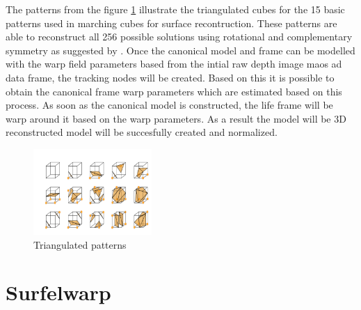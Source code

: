 \documentclass[12pt]{report}
\begin{document}
The patterns from the figure \ref{fig:patterns} illustrate the triangulated cubes for the 15 basic patterns used in marching cubes for surface recontruction.
These patterns are able to reconstruct all  256 possible solutions using rotational and  complementary symmetry as suggested by .
Once the canonical model and frame can be modelled with the warp field parameters based from the intial raw depth image maos ad data frame, the tracking nodes will be created.
Based on this it is possible to obtain the canonical frame warp parameters which  are estimated based on this process. 
As soon as the canonical model is constructed, the life frame will be warp around it based on the warp parameters. As a result the model will be 3D reconstructed model will be succesfully created and normalized.
\begin{figure} %
    \centering
    \includegraphics[width=0.4\textwidth]{shapes.png}
    \caption{Triangulated patterns \cite[]{fang_zhao_wen_zhang_2018}}
    \label{fig:patterns}
\end{figure}

\enlargethispage{\baselineskip}

\section{Surfelwarp}











 \nocite{*}   %

\end{document}
